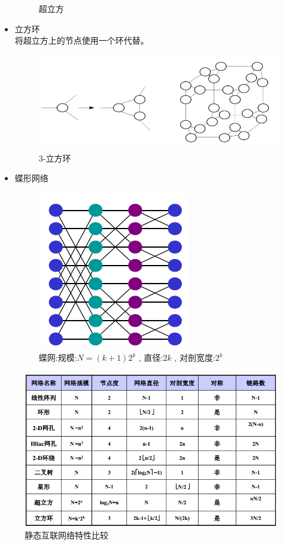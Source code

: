 \documentclass[UTF8,a4paper]{ctexart}
\begin{document}
\begin{itemize}
\begin{figure}[H]
      \caption{超立方}
    \end{figure}
    \item 立方环\\
    将超立方上的节点使用一个环代替。
    \begin{figure}[H]
      \centering
      \includegraphics[scale = 0.3]{assets/ParallelComputing_b9cb4.png}
      \caption{3-立方环}
    \end{figure}
    \item 蝶形网络
    \begin{figure}[H]
      \centering
      \includegraphics[scale = 0.4]{assets/ParallelComputing_00400.png}
      \caption{蝶网:规模:$N = (k+1)2^k$ , 直径:$2k$ , 对剖宽度:$2^k$}
    \end{figure}

  \end{itemize}

  \begin{figure}[H]
    \centering
    \includegraphics[scale = 0.5]{assets/ParallelComputing_3087c.png}
    \caption{静态互联网络特性比较}
  \end{figure}
\end{document}
